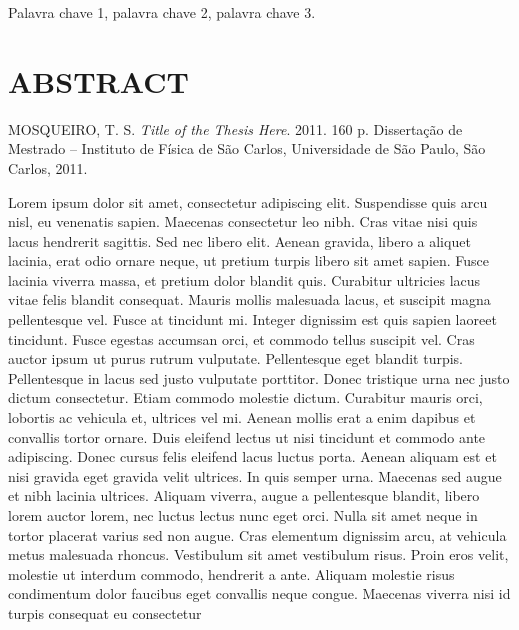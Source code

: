 \begin{palavraschave}
	Palavra chave 1, palavra chave 2, palavra chave 3.
\end{palavraschave}




\chapter*{ABSTRACT}

\begin{citacaotese}
  MOSQUEIRO, T. S. \textit{Title of the Thesis Here}. 2011. 160
  p. Dissertação de Mestrado -- Instituto de F\'isica de S\~ao Carlos,
  Universidade de S\~ao Paulo, S\~ao Carlos, 2011.
\end{citacaotese}
  
\begin{resumo}
  Lorem ipsum dolor sit amet, consectetur adipiscing elit. Suspendisse
  quis arcu nisl, eu venenatis sapien. Maecenas consectetur leo
  nibh. Cras vitae nisi quis lacus hendrerit sagittis. Sed nec libero
  elit. Aenean gravida, libero a aliquet lacinia, erat odio ornare
  neque, ut pretium turpis libero sit amet sapien. Fusce lacinia
  viverra massa, et pretium dolor blandit quis. Curabitur ultricies
  lacus vitae felis blandit consequat. Mauris mollis malesuada lacus,
  et suscipit magna pellentesque vel. Fusce at tincidunt mi. Integer
  dignissim est quis sapien laoreet tincidunt. Fusce egestas accumsan
  orci, et commodo tellus suscipit vel. Cras auctor ipsum ut purus
  rutrum vulputate. Pellentesque eget blandit turpis. Pellentesque in
  lacus sed justo vulputate porttitor. Donec tristique urna nec justo
  dictum consectetur. Etiam commodo molestie dictum. Curabitur mauris
  orci, lobortis ac vehicula et, ultrices vel mi. Aenean mollis erat a
  enim dapibus et convallis tortor ornare. Duis eleifend lectus ut
  nisi tincidunt et commodo ante adipiscing. Donec cursus felis
  eleifend lacus luctus porta. Aenean aliquam est et nisi gravida eget
  gravida velit ultrices. In quis semper urna. Maecenas sed augue et
  nibh lacinia ultrices. Aliquam viverra, augue a pellentesque
  blandit, libero lorem auctor lorem, nec luctus lectus nunc eget
  orci. Nulla sit amet neque in tortor placerat varius sed non
  augue. Cras elementum dignissim arcu, at vehicula metus malesuada
  rhoncus. Vestibulum sit amet vestibulum risus. Proin eros velit,
  molestie ut interdum commodo, hendrerit a ante. Aliquam molestie
  risus condimentum dolor faucibus eget convallis neque
  congue. Maecenas viverra nisi id turpis consequat eu consectetur

\end{resumo}
